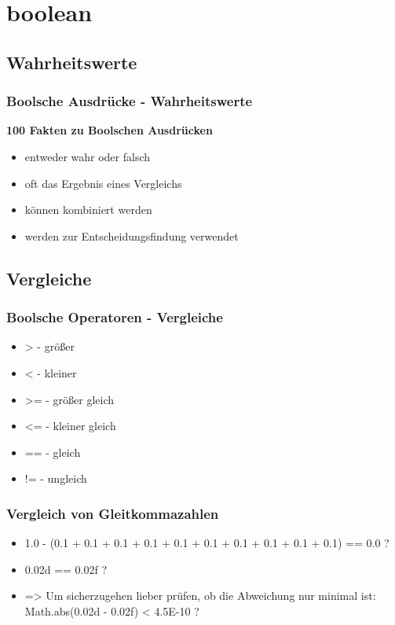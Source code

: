 \documentclass[final]{beamer}
\begin{document}
\section{boolean}
\subsection{Wahrheitswerte}
\begin{frame}
	\frametitle{Boolsche Ausdrücke - Wahrheitswerte}
	\textbf{100 Fakten zu Boolschen Ausdrücken}
	\begin{itemize}
		\item{entweder wahr oder falsch}
		\item{oft das Ergebnis eines Vergleichs}
		\item{können kombiniert werden}
		\item{werden zur Entscheidungsfindung verwendet}
	\end{itemize}
\end{frame}


\subsection{Vergleiche}
\begin{frame}
	\frametitle{Boolsche Operatoren - Vergleiche}
	\begin{itemize}
		\item{>  - größer}
		\item{<  - kleiner}
		\item{>= - größer gleich}
		\item{<= - kleiner gleich}
		\item{== - gleich}
		\item{!= - ungleich}
	\end{itemize}
\end{frame}

\begin{frame}
	\frametitle{Vergleich von Gleitkommazahlen}
	\begin{itemize}
		\item{1.0 - (0.1 + 0.1 + 0.1 + 0.1 + 0.1 + 0.1 + 0.1 + 0.1 + 0.1 + 0.1) == 0.0 ?}
		\item{0.02d == 0.02f ?}
		\item{=> Um sicherzugehen lieber prüfen, ob die Abweichung nur minimal ist: \\ 
		Math.abs(0.02d - 0.02f) < 4.5E-10 ?}
	\end{itemize}
\end{frame}
\end{document}
